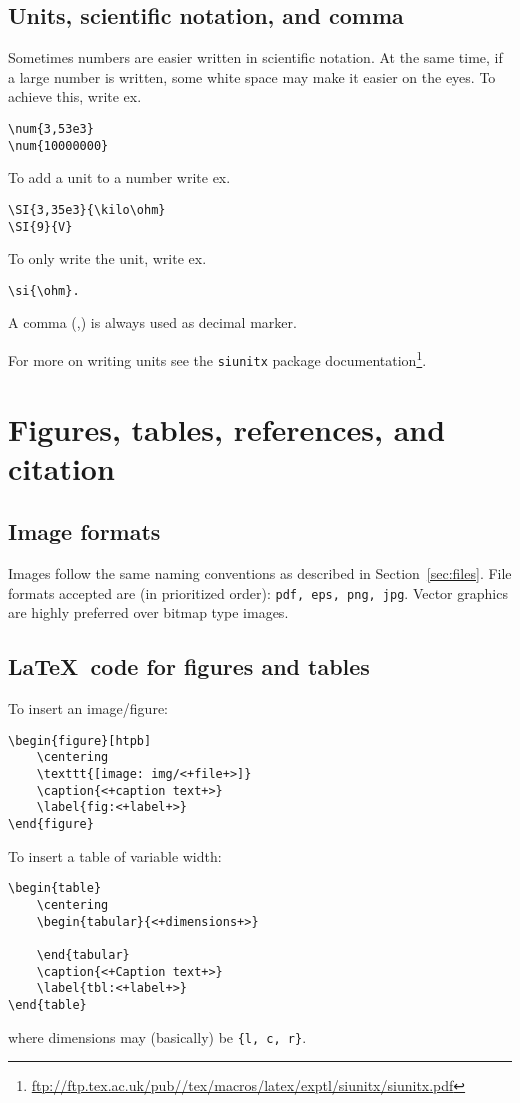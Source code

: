 \subsection{Units, scientific notation, and comma}
Sometimes numbers are easier written in scientific notation. At the same time, if a large number is written, some white space may make it easier on the eyes. To achieve this, write ex.
\begin{verbatim}
\num{3,53e3} 
\num{10000000}
\end{verbatim}
To add a unit to a number write ex.
\begin{verbatim}
\SI{3,35e3}{\kilo\ohm}
\SI{9}{V}
\end{verbatim}
To only write the unit, write ex.
\begin{verbatim}
\si{\ohm}. 
\end{verbatim}
A comma (,) is always used as decimal marker.


For more on writing units see the \texttt{siunitx} package documentation\footnote{\url{ftp://ftp.tex.ac.uk/pub//tex/macros/latex/exptl/siunitx/siunitx.pdf}}.


\section{Figures, tables, references, and citation}
\label{sec:figtabref}
\subsection{Image formats}
Images follow the same naming conventions as described in Section~\ref{sec:files}. File formats accepted are (in prioritized order): \texttt{pdf, eps, png, jpg}. Vector graphics are highly preferred over bitmap type images.


\subsection{\LaTeX\ code for figures and tables}
To insert an image\slash figure:
\begin{verbatim}
\begin{figure}[htpb]
    \centering
    \texttt{[image: img/<+file+>]}
    \caption{<+caption text+>}
    \label{fig:<+label+>}
\end{figure}
\end{verbatim}


To insert a table of variable width:
\begin{verbatim}
\begin{table}
    \centering
    \begin{tabular}{<+dimensions+>}

    \end{tabular}
    \caption{<+Caption text+>}
    \label{tbl:<+label+>}
\end{table}
\end{verbatim}
where dimensions may (basically) be \texttt{\{l, c, r\}}.


